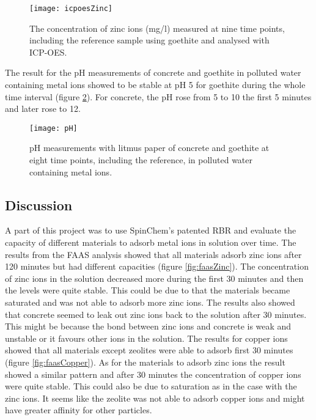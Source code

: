 \begin{figure}[H]
    \centering
    \texttt{[image: icpoesZinc]}
    \caption{The concentration of zinc ions (mg/l) measured at nine time points, including the reference sample using goethite and analysed with ICP-OES.}
	\label{fig:icpoesZinc}
\end{figure}

The result for the pH measurements of concrete and goethite in polluted water containing metal ions showed to be stable at pH 5 for goethite during the whole time interval (figure \ref{fig:pH}). For concrete, the pH rose from 5 to 10 the first 5 minutes and later rose to 12.


\begin{figure}[H]
    \centering
    \texttt{[image: pH]}
    \caption{pH measurements with litmus paper of concrete and goethite at eight time points, including the reference, in polluted water containing metal ions.}
	\label{fig:pH}
\end{figure}

\subsection{Discussion}
A part of this project was to use SpinChem\textsuperscript{\textregistered}’s patented RBR and evaluate the capacity of different materials to adsorb metal ions in solution over time. The results from the FAAS analysis showed that all materials adsorb zinc ions after 120 minutes but had different capacities (figure \ref{fig:faasZinc}). The concentration of zinc ions in the solution decreased more during the first 30 minutes and then the levels were quite stable. This could be due to that the materials became saturated and was not able to adsorb more zinc ions. The results also showed that concrete seemed to leak out zinc ions back to the solution after 30 minutes. This might be because the bond between zinc ions and concrete is weak and unstable or it favours other ions in the solution. The results for copper ions showed that all materials except zeolites were able to adsorb first 30 minutes (figure \ref{fig:faasCopper}). As for the materials to adsorb zinc ions the result showed a similar pattern and after 30 minutes the concentration of copper ions were quite stable. This could also be due to saturation as in the case with the zinc ions. It seems like the zeolite was not able to adsorb copper ions and might have greater affinity for other particles. 

